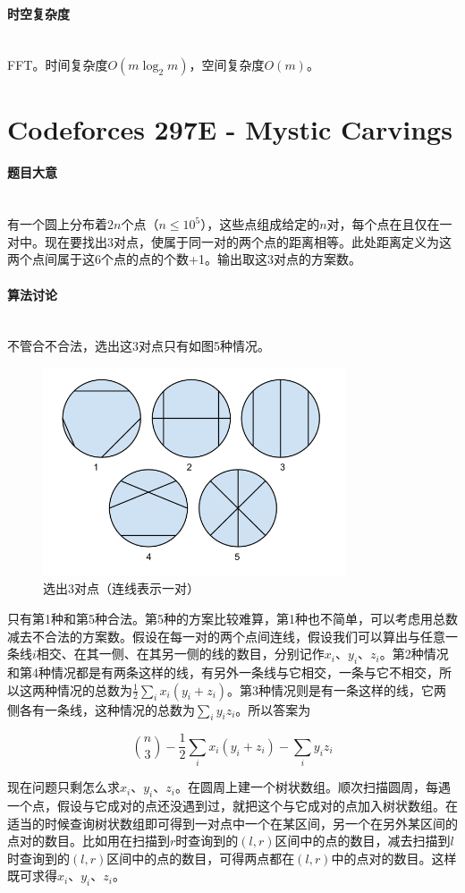 \documentclass[UTF8]{ctexart}
\newcommand{\myparagraph}[1]{\paragraph{#1}\mbox{}\\}
\theoremstyle{nonumberplain}
\begin{document}
		\myparagraph{时空复杂度}
		
			FFT。时间复杂度$O(m\log_2m)$，空间复杂度$O(m)$。
	
	\section{Codeforces 297E - Mystic Carvings}
	
		\myparagraph{题目大意}
		
			有一个圆上分布着$2n$个点（$n \leq 10^5$），这些点组成给定的$n$对，每个点在且仅在一对中。现在要找出3对点，使属于同一对的两个点的距离相等。此处距离定义为这两个点间属于这6个点的点的个数+1。输出取这3对点的方案数。
		
		\myparagraph{算法讨论}
		
			不管合不合法，选出这3对点只有如图5种情况。
			
			\begin{figure}[ht]
				\centering
				\includegraphics[width=0.8\textwidth]{fig297e_1.png}
				\caption{选出3对点（连线表示一对）}
			\end{figure}
			
			只有第1种和第5种合法。第5种的方案比较难算，第1种也不简单，可以考虑用总数减去不合法的方案数。假设在每一对的两个点间连线，假设我们可以算出与任意一条线$i$相交、在其一侧、在其另一侧的线的数目，分别记作$x_i$、$y_i$、$z_i$。第2种情况和第4种情况都是有两条这样的线，有另外一条线与它相交，一条与它不相交，所以这两种情况的总数为$\frac{1}{2}\sum_i x_i(y_i+z_i)$。第3种情况则是有一条这样的线，它两侧各有一条线，这种情况的总数为$\sum_i y_i z_i$。所以答案为
			
			$$ \binom{n}{3}-\frac{1}{2}\sum_i x_i(y_i+z_i)-\sum_i y_i z_i $$
			
			现在问题只剩怎么求$x_i$、$y_i$、$z_i$。在圆周上建一个树状数组。顺次扫描圆周，每遇一个点，假设与它成对的点还没遇到过，就把这个与它成对的点加入树状数组。在适当的时候查询树状数组即可得到一对点中一个在某区间，另一个在另外某区间的点对的数目。比如用在扫描到$r$时查询到的$(l,r)$区间中的点的数目，减去扫描到$l$时查询到的$(l,r)$区间中的点的数目，可得两点都在$(l,r)$中的点对的数目。这样既可求得$x_i$、$y_i$、$z_i$。
		
\end{document}
